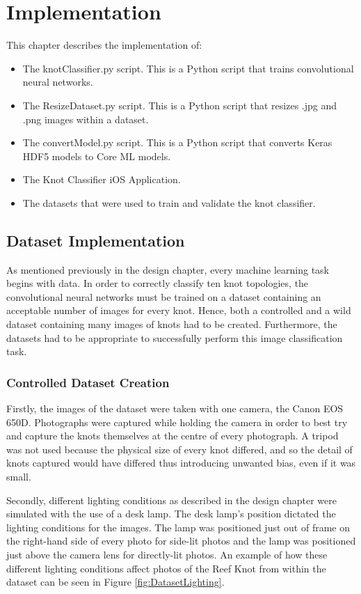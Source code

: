\documentclass{l4proj}
\begin{document}
\chapter{Implementation}
This chapter describes the implementation of:
\begin{itemize}
	\item The knotClassifier.py script. This is a Python script that trains convolutional neural networks.
	\item The ResizeDataset.py script. This is a Python script that resizes .jpg and .png images within a dataset.
	\item The convertModel.py script. This is a Python script that converts Keras HDF5 models to Core ML models.
	\item The Knot Classifier iOS Application.
	\item The datasets that were used to train and validate the knot classifier.
\end{itemize}

\section{Dataset Implementation}
As mentioned previously in the design chapter, every machine learning task begins with data.
In order to correctly classify ten knot topologies, the convolutional neural networks must be trained on a dataset containing an acceptable number of images for every knot.
Hence, both a controlled and a wild dataset containing many images of knots had to be created.
Furthermore, the datasets had to be appropriate to successfully perform this image classification task.

\subsection{Controlled Dataset Creation}
Firstly, the images of the dataset were taken with one camera, the Canon EOS 650D.
Photographs were captured while holding the camera in order to best try and capture the knots themselves at the centre of every photograph.
A tripod was not used because the physical size of every knot differed, and so the detail of knots captured would have differed thus introducing unwanted bias, even if it was small.

Secondly, different lighting conditions as described in the design chapter were simulated with the use of a desk lamp.
The desk lamp's position dictated the lighting conditions for the images. 
The lamp was positioned just out of frame on the right-hand side of every photo for side-lit photos and the lamp was positioned just above the camera lens for directly-lit photos. 
An example of how these different lighting conditions affect photos of the Reef Knot from within the dataset can be seen in Figure \ref{fig:DatasetLighting}.
\end{document}
